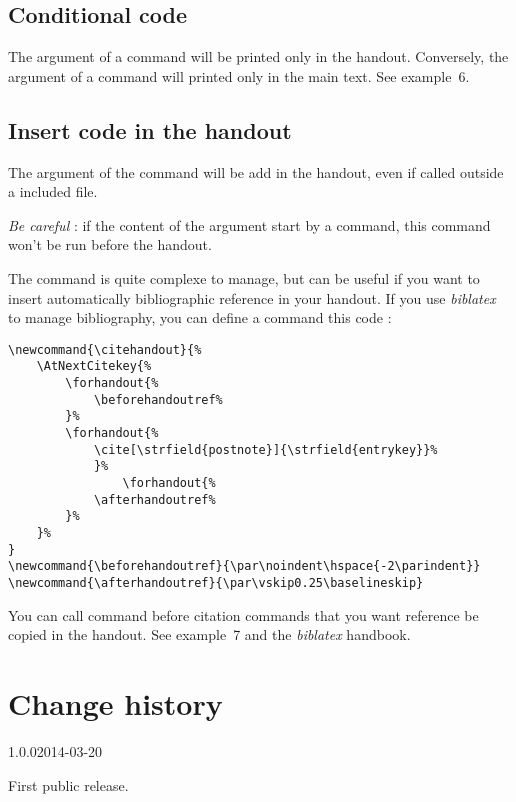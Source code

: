 \documentclass{ltxdockit}[2011/03/25]
\begin{document}
\subsection{Conditional code}

The argument of a   command will be printed only in the handout. Conversely, the argument of a command  will printed only in the main text. See example~6.

\subsection{Insert code in the handout}

The argument of the   command will be add in the handout, even if called outside a included file. 

\emph{Be careful} : if the content of the argument start by a command, this command won't be run before the handout. 

The  command is quite complexe to manage, but can be useful if you want to insert automatically bibliographic reference in your handout. If you use \emph{biblatex} to manage bibliography, you can define a  command  this code  :

\begin{verbatim}
\newcommand{\citehandout}{%
	\AtNextCitekey{%
		\forhandout{%
			\beforehandoutref%
		}%
		\forhandout{%
			\cite[\strfield{postnote}]{\strfield{entrykey}}%
			}%
        		\forhandout{%
			\afterhandoutref%
		}%
	}%
}
\newcommand{\beforehandoutref}{\par\noindent\hspace{-2\parindent}}
\newcommand{\afterhandoutref}{\par\vskip0.25\baselineskip}
\end{verbatim}

You can call  command before citation commands that you want reference be copied in the handout. See example~7 and the \emph{biblatex} handbook.


\section{Change history}

\begin{changelog}

\begin{release}{1.0.0}{2014-03-20}
\item First public release.
\end{release}
\end{changelog}
\end{document}
